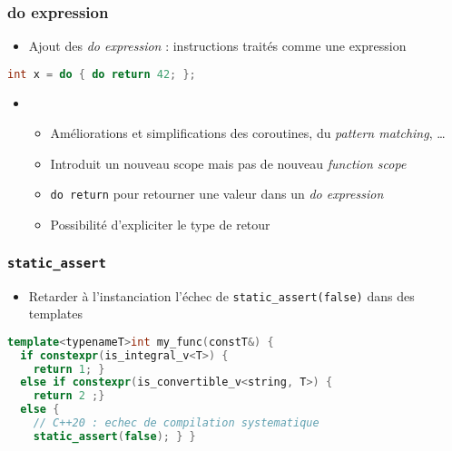 \documentclass[C++.tex]{subfiles}
\begin{document}
\begin{frame}[fragile]
	\frametitle{do expression}
	\begin{itemize}
		\item Ajout des \og{}\textit{do expression}\fg{} : instructions traités comme une expression
	\end{itemize}

	\begin{lstlisting}[language=C++]
int x = do { do return 42; };\end{lstlisting}

	\begin{itemize}
		\item[]
		\begin{itemize}
			\item Améliorations et simplifications des coroutines, du \textit{pattern matching}, \ldots{}
			\item Introduit un nouveau scope mais pas de nouveau \textit{function scope}
			\item \lstinline|do return| pour retourner une valeur dans un \textit{do expression}
			\item Possibilité d'expliciter le type de retour
		\end{itemize}
	\end{itemize}
\end{frame}

\begin{frame}[fragile]
	\frametitle{\lstinline|static_assert|}
	\begin{itemize}
		\item Retarder à l'instanciation l'échec de \lstinline|static_assert(false)| dans des templates
	\end{itemize}

	\begin{lstlisting}[language=C++]
template<typenameT>int my_func(constT&) {
  if constexpr(is_integral_v<T>) {
    return 1; } 
  else if constexpr(is_convertible_v<string, T>) {
    return 2 ;}
  else {
    // C++20 : echec de compilation systematique
    static_assert(false); } }\end{lstlisting}

\end{frame}
\end{document}
